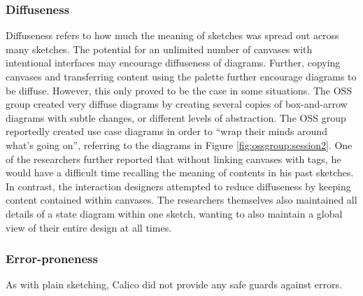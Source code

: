 
\subsubsection{Diffuseness}
Diffuseness refers to how much the meaning of sketches was spread out across many sketches. The potential for an unlimited number of canvases with intentional interfaces may encourage diffuseness of diagrams. Further, copying canvases and transferring content using the palette further encourage diagrams to be diffuse. However, this only proved to be the case in some situations. The OSS group created very diffuse diagrams by creating several copies of box-and-arrow diagrams with subtle changes, or different levels of abstraction. The OSS group reportedly created use case diagrams in order to ``wrap their minds around what's going on'', referring to the diagrams in Figure \ref{fig:ossgroup:session2}. One of the researchers further reported that without linking canvases with tags, he would have a difficult time recalling the meaning of contents in his past sketches. In contrast, the interaction designers attempted to reduce diffuseness by keeping content contained within canvases. The researchers themselves also maintained all details of a state diagram within one sketch, wanting to also maintain a global view of their entire design at all times.


%

\subsubsection{Error-proneness}

As with plain sketching, Calico did not provide any safe guards against errors.

%


